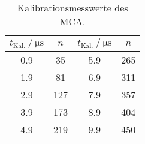 \begin{table}
\centering
\caption{Kalibrationsmesswerte des MCA.}
\begin{tabular}{c c | c c}
\toprule
\multicolumn{1}{c}{$t_\text{Kal.} \:/\: \si{\micro\second}$} & \multicolumn{1}{c}{$n$}
& \multicolumn{1}{c}{$t_\text{Kal.} \:/\: \si{\micro\second}$} & \multicolumn{1}{c}{$n$}  \\
\midrule
0.9 & 35  & 5.9 & 265 \\
1.9 & 81  & 6.9 & 311 \\
2.9 & 127 & 7.9 & 357 \\
3.9 & 173 & 8.9 & 404 \\
4.9 & 219 & 9.9 & 450 \\
\bottomrule
\end{tabular}
\label{tabular_03}
\end{table}

